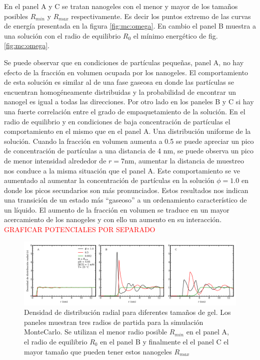 En el panel A y C se tratan nanogeles con el menor y mayor de los tama\~nos posibles $R_{min}$ y $R_{max}$ respectivamente.  Es decir los puntos extremo de las curvas de energ\'ia presentada en la figura \ref{fig:mc:omega}. En cambio el panel B muestra a una soluci\'on con el radio de equilibrio $R_0$ el m\'inimo energ\'etico de fig. \ref{fig:mc:omega}.

Se puede observar que en condiciones de part\'iculas peque\~nas, panel A, no hay efecto de la fracci\'on en volumen ocupada por los nanogeles. El comportamiento de esta soluci\'on es similar al de una fase gaseosa en donde las part\'iculas se encuentran homog\'eneamente distribuidas y la probabilidad de encontrar un nanogel es igual a todas las direcciones.
Por otro lado en los paneles B y C si hay una fuerte correlaci\'on entre el grado de empaquetamiento de la soluci\'on.
En el radio de equilibrio y en condiciones de baja concentraci\'on de part\'iculas el comportamiento en el mismo que en el panel A. Una distribuci\'on uniforme de la soluci\'on. Cuando la fracci\'on en volumen aumenta a 0.5 se puede apreciar un pico de concentraci\'on de part\'iculas a una distancia de 4 nm, se puede observa un pico de menor intensidad alrededor de $r = 7$nm, aumentar la distancia de muestreo nos conduce a la misma situaci\'on que el panel A.
Este comportamiento se ve aumentado al aumentar la concentraci\'on de part\'iculas en la soluci\'on $\phi = 1.0$ en donde los picos secundarios son más pronunciados.
Estos resultados nos indican una transici\'on de un estado m\'as ``gaseoso'' a un ordenamiento caracter\'istico de un l\'iquido. 
El aumento de la fracci\'on en volumen se traduce en un mayor acercamiento de los nanogeles y con ello un aumento en su interacci\'on. 
\textcolor{red}{GRAFICAR POTENCIALES POR SEPARADO}


\begin{figure}[!tb]
	\centering
	\includegraphics[width=1\linewidth]{Figures/graph-mc/rdf-gels.pdf}
	\caption{Densidad de distribuci\'on radial para diferentes tama\~nos de gel. Los paneles muestran tres radios de partida para la simulaci\'on MonteCarlo. Se utilizan el menor radio posible $R_{min}$ en el panel A, el radio de equilibrio $R_0$ en el panel B y finalmente el el panel C el mayor tama\~no que pueden tener estos nanogeles $R_{max}$}
	\label{fig:mc:redf-gels-r}
\end{figure}

